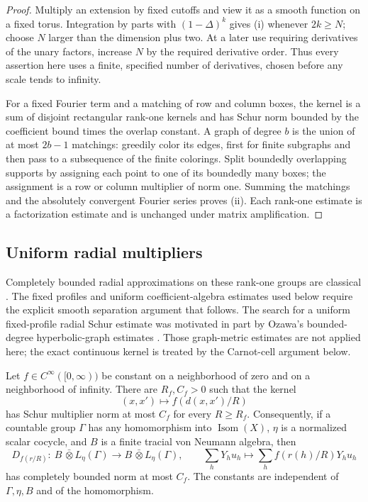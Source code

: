 \begin{proof}
Multiply an extension by fixed cutoffs and view it as a smooth function
on a fixed torus.  Integration by parts with
\((1-\Delta)^k\) gives (i) whenever \(2k\ge N\); choose \(N\) larger
than the dimension plus two.  At a later use requiring derivatives of
the unary factors, increase \(N\) by the required derivative order.
Thus every assertion here uses a finite, specified number of
derivatives, chosen before any scale tends to infinity.

For a fixed Fourier term and a matching of row and column boxes, the
kernel is a sum of disjoint rectangular rank-one kernels and has Schur
norm bounded by the coefficient bound times the overlap constant.
A graph of degree \(b\) is the union of at most \(2b-1\) matchings:
greedily color its edges, first for finite subgraphs and then pass to a
subsequence of the finite colorings.  Split boundedly overlapping
supports by assigning each point to one of its boundedly many boxes;
the assignment is a row or column multiplier of norm one.  Summing the
matchings and the absolutely convergent Fourier series proves (ii).
Each rank-one estimate is a factorization estimate and is unchanged
under matrix amplification.
\end{proof}

\subsection{Uniform radial multipliers}

Completely bounded radial approximations on these rank-one groups are
classical \cite{CowlingHaagerup1989}. The fixed profiles and uniform
coefficient-algebra estimates used below require the explicit smooth
separation argument that follows.
The search for a uniform fixed-profile radial Schur estimate was
motivated in part by Ozawa's bounded-degree hyperbolic-graph estimates
\cite[Theorem~1]{Ozawa2008}. Those graph-metric estimates are not
applied here; the exact continuous kernel is treated by the Carnot-cell
argument below.

\begin{proposition}\label{prop:ray-radial}
Let \(f\in C^\infty([0,\infty))\) be constant on a neighborhood of zero
and on a neighborhood of infinity.  There are \(R_f,C_f>0\) such that
the kernel
\[
 (x,x')\longmapsto f(d(x,x')/R)
\]
has Schur multiplier norm at most \(C_f\) for every \(R\ge R_f\).
Consequently, if a countable group \(\Gamma\) has any homomorphism into
\(\operatorname{Isom}(X)\), \(\eta\) is a normalized scalar cocycle,
and \(B\) is a finite tracial von Neumann algebra, then
\[
 D_{f(r/R)}:\ B\,\bar\otimes L_\eta(\Gamma)\longrightarrow
 B\,\bar\otimes L_\eta(\Gamma),\qquad
 \sum_hY_hu_h\longmapsto\sum_h f(r(h)/R)Y_hu_h
\]
has completely bounded norm at most \(C_f\).  The constants are
independent of \(\Gamma,\eta,B\) and of the homomorphism.
\end{proposition}

